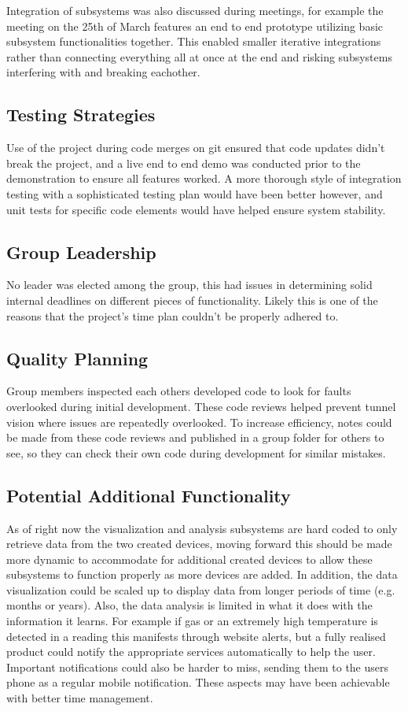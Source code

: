 \documentclass[]{report}
\begin{document}
	Integration of subsystems was also discussed during meetings, for example the meeting on the 25th of March features an end to end prototype utilizing basic subsystem functionalities together. This enabled smaller iterative integrations rather than connecting everything all at once at the end and risking subsystems interfering with and breaking eachother.
	
	\subsection{Testing Strategies}
	Use of the project during code merges on git ensured that code updates didn't break the project, and a live end to end demo was conducted prior to the demonstration to ensure all features worked. A more thorough style of integration testing with a sophisticated testing plan would have been better however, and unit tests for specific code elements would have helped ensure system stability.
	
	\subsection{Group Leadership}
	No leader was elected among the group, this had issues in determining solid internal deadlines on different pieces of functionality. Likely this is one of the reasons that the project's time plan couldn't be properly adhered to.
	
	\subsection{Quality Planning}
	Group members inspected each others developed code to look for faults overlooked during initial development. These code reviews helped prevent tunnel vision where issues are repeatedly overlooked. To increase efficiency, notes could be made from these code reviews and published in a group folder for others to see, so they can check their own code during development for similar mistakes.
	
	\subsection{Potential Additional Functionality}
	As of right now the visualization and analysis subsystems are hard coded to only retrieve data from the two created devices, moving forward this should be made more dynamic to accommodate for additional created devices to allow these subsystems to function properly as more devices are added. In addition, the data visualization could be scaled up to display data from longer periods of time (e.g. months or years). Also, the data analysis is limited in what it does with the information it learns. For example if gas or an extremely high temperature is detected in a reading this manifests through website alerts, but a fully realised product could notify the appropriate services automatically to help the user. Important notifications could also be harder to miss, sending them to the users phone as a regular mobile notification. These aspects may have been achievable with better time management.
	
\end{document}
